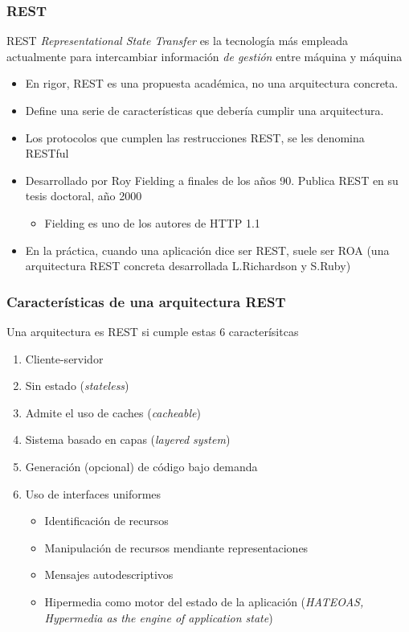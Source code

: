 \documentclass[ucs]{beamer}
\begin{document}
\begin{frame}[fragile]
\frametitle{REST}
REST \emph{Representational State Transfer} 
es la tecnología más empleada actualmente para intercambiar
información \emph{de gestión} entre máquina y máquina

\begin{itemize}
\item
En rigor, REST es una propuesta académica, no una arquitectura concreta.
\item
Define una serie de características que debería cumplir una arquitectura.
\item
Los protocolos que cumplen las restrucciones REST, se les denomina RESTful
\item

Desarrollado por
Roy Fielding a finales de los años 90.
Publica REST en su tesis doctoral, año 2000

\begin{itemize}
\item
Fielding es uno de los autores de HTTP 1.1
\end{itemize}

\item
En la práctica, cuando una aplicación dice ser REST, suele ser ROA
(una arquitectura REST concreta desarrollada L.Richardson y S.Ruby)

\end{itemize}

\end{frame}


\begin{frame}[fragile]
\frametitle{Características de una arquitectura REST}
Una arquitectura es REST si cumple estas 6 caracterísitcas
\begin{enumerate}
\item
Cliente-servidor
\item
Sin estado (\emph{stateless})
\item
Admite el uso de caches (\emph{cacheable})
\item
Sistema basado en capas (\emph{layered system})
\item
Generación (opcional) de código bajo demanda
\item
Uso de interfaces uniformes

\begin{itemize}
\item
Identificación de recursos
\item
Manipulación de recursos mendiante representaciones
\item
Mensajes autodescriptivos
\item
Hipermedia como motor del estado de la aplicación (\emph{HATEOAS, 
Hypermedia as the engine of application state})
\end{itemize}

\end{enumerate}

\end{frame}
\end{document}
